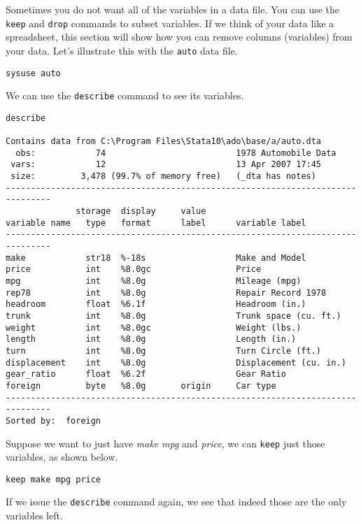 Sometimes you do not want all of the variables in a data file. You can use the \lstinline{keep} and \lstinline{drop} commands to subset variables. If we think of your data like a spreadsheet, this section will show how you can remove columns (variables) from your data. Let's illustrate this with the \lstinline{auto} data file.

\begin{lstlisting}
sysuse auto
\end{lstlisting}

We can use the \lstinline{describe} command to see its variables.

\begin{lstlisting}
describe

Contains data from C:\Program Files\Stata10\ado\base/a/auto.dta
  obs:            74                          1978 Automobile Data
 vars:            12                          13 Apr 2007 17:45
 size:         3,478 (99.7% of memory free)   (_dta has notes)
-------------------------------------------------------------------------------
              storage  display     value
variable name   type   format      label      variable label
-------------------------------------------------------------------------------
make            str18  %-18s                  Make and Model
price           int    %8.0gc                 Price
mpg             int    %8.0g                  Mileage (mpg)
rep78           int    %8.0g                  Repair Record 1978
headroom        float  %6.1f                  Headroom (in.)
trunk           int    %8.0g                  Trunk space (cu. ft.)
weight          int    %8.0gc                 Weight (lbs.)
length          int    %8.0g                  Length (in.)
turn            int    %8.0g                  Turn Circle (ft.)
displacement    int    %8.0g                  Displacement (cu. in.)
gear_ratio      float  %6.2f                  Gear Ratio
foreign         byte   %8.0g       origin     Car type
-------------------------------------------------------------------------------
Sorted by:  foreign
\end{lstlisting}

Suppose we want to just have \textit{make} \textit{mpg} and \textit{price}, we can \lstinline{keep} just those variables, as shown below.

\begin{lstlisting}
keep make mpg price
\end{lstlisting}

If we issue the \lstinline{describe} command again, we see that indeed those are the only variables left.

